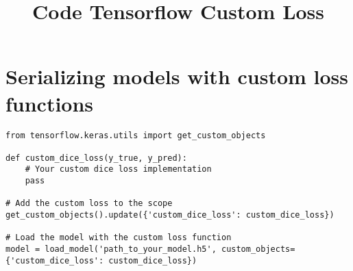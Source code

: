 \documentclass{../template/texnote}
\title{Code Tensorflow Custom Loss}
\begin{document}
    \maketitle {}
\section{Serializing models with custom loss functions}
\begin{verbatim}
from tensorflow.keras.utils import get_custom_objects

def custom_dice_loss(y_true, y_pred):
    # Your custom dice loss implementation
    pass

# Add the custom loss to the scope
get_custom_objects().update({'custom_dice_loss': custom_dice_loss})

# Load the model with the custom loss function
model = load_model('path_to_your_model.h5', custom_objects={'custom_dice_loss': custom_dice_loss})
\end{verbatim}
    \printbibliography
\end{document}
